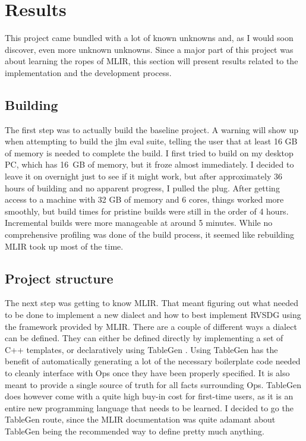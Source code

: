 \section{Results} \label{sec:results}
This project came bundled with a lot of known unknowns and, as I would soon discover, even more unknown unknowns. Since a major part of this project was about learning the ropes of MLIR, this section will present results related to the implementation and the development process.

\subsection{Building}
The first step was to actually build the baseline project. A warning will show up when attempting to build the jlm eval suite, telling the user that at least 16 GB of memory is needed to complete the build. I first tried to build on my desktop PC, which has 16 GB of memory, but it froze almost immediately. I decided to leave it on overnight just to see if it might work, but after approximately 36 hours of building and no apparent progress, I pulled the plug. After getting access to a machine with 32 GB of memory and 6 cores, things worked more smoothly, but build times for pristine builds were still in the order of 4 hours. Incremental builds were more manageable at around 5 minutes. While no comprehensive profiling was done of the build process, it seemed like rebuilding MLIR took up most of the time.

\subsection{Project structure} \label{sec:results:project-structure}
The next step was getting to know MLIR. That meant figuring out what needed to be done to implement a new dialect and how to best implement RVSDG using the framework provided by MLIR. There are a couple of different ways a dialect can be defined. They can either be defined directly by implementing a set of C++ templates, or declaratively using TableGen \cite{mlir_tablegen_ods}. Using TableGen has the benefit of automatically generating a lot of the necessary boilerplate code needed to cleanly interface with Ops once they have been properly specified. It is also meant to provide a single source of truth for all facts surrounding Ops. TableGen does however come with a quite high buy-in cost for first-time users, as it is an entire new programming language that needs to be learned. I decided to go the TableGen route, since the MLIR documentation was quite adamant about TableGen being the recommended way to define pretty much anything.

